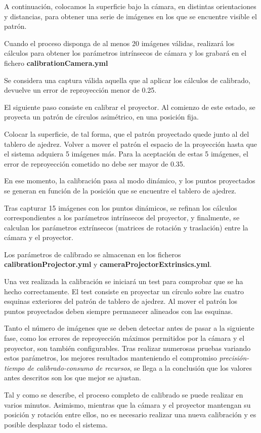 A continuación, colocamos la superficie bajo la cámara, en distintas orientaciones y distancias, para obtener una serie de imágenes en los que se encuentre visible el patrón.

Cuando el proceso disponga de al menos 20 imágenes válidas, realizará los cálculos para obtener los parámetros intrínsecos de cámara y los grabará en el fichero \textbf{calibrationCamera.yml}

Se considera una captura válida aquella que al aplicar los cálculos de calibrado, devuelve un error de reproyección menor de 0.25. 

El siguiente paso consiste en calibrar el proyector. Al comienzo de este estado, se proyecta un patrón de círculos asimétrico, en una posición fija.

Colocar la superficie, de tal forma, que el patrón proyectado quede junto al del tablero de ajedrez. Volver a mover el patrón el espacio de la  proyección hasta que el sistema adquiera 5 imágenes más. Para la aceptación de estas 5 imágenes, el error de reproyección cometido no debe ser mayor de 0.35.

En ese momento, la calibración pasa al modo dinámico, y los puntos proyectados se generan en función de la posición que se encuentre el tablero de ajedrez.

Tras capturar 15 imágenes con los puntos dinámicos, se refinan los cálculos correspondientes a los parámetros intrínsecos del proyector, y finalmente, se calculan los parámetros extrínsecos (matrices de rotación y traslación) entre la cámara y el proyector.

Los parámetros de calibrado se almacenan en los ficheros \textbf{calibrationProjector.yml} y \textbf{cameraProjectorExtrinsics.yml}.

Una vez realizada la calibración se iniciará un test para comprobar que se ha hecho correctamente. El test consiste en proyectar un círculo sobre las cuatro esquinas exteriores del patrón de tablero de ajedrez. Al mover el patrón los puntos proyectados deben siempre permanecer alineados con las esquinas.

Tanto el número de imágenes que se deben detectar antes de pasar a la siguiente fase, como los errores de reproyección máximos permitidos por la cámara y el proyector, son también configurables. Tras realizar numerosas pruebas variando estos parámetros, los mejores resultados manteniendo el compromiso \textit{precisión-tiempo de calibrado-consumo de recursos}, se llega a la conclusión que los valores antes descritos son los que mejor se ajustan. 

Tal y como se describe, el proceso completo de calibrado se puede realizar en varios minutos. Asimismo, mientras que la cámara y el proyector mantengan su posición y rotación entre ellos, no es necesario realizar una nueva calibración y es posible desplazar todo el sistema.


